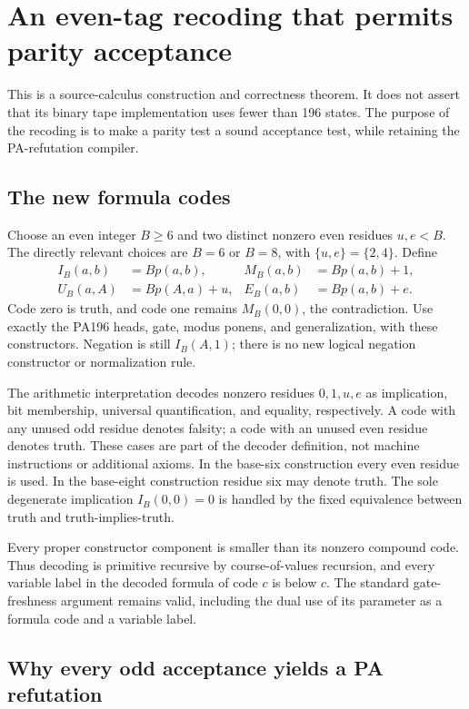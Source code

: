 \section{An even-tag recoding that permits parity acceptance}
\label{sec:parity-recoding}

This is a source-calculus construction and correctness theorem.  It does not
assert that its binary tape implementation uses fewer than 196 states.
The purpose of the recoding is to make a parity test a sound acceptance test,
while retaining the PA-refutation compiler.

\subsection{The new formula codes}

Choose an even integer $B\ge6$ and two distinct nonzero even residues
$u,e<B$.  The directly relevant choices are $B=6$ or $B=8$, with
$\{u,e\}=\{2,4\}$.  Define
\begin{align*}
 I_B(a,b)&=Bp(a,b),& M_B(a,b)&=Bp(a,b)+1,\\
 U_B(a,A)&=Bp(A,a)+u,& E_B(a,b)&=Bp(a,b)+e.
\end{align*}
Code zero is truth, and code one remains $M_B(0,0)$, the contradiction.
Use exactly the PA196 heads, gate, modus ponens, and generalization, with
these constructors.  Negation is still $I_B(A,1)$; there is no new logical
negation constructor or normalization rule.

The arithmetic interpretation decodes nonzero residues $0,1,u,e$ as
implication, bit membership, universal quantification, and equality,
respectively.  A code with any unused odd residue denotes falsity; a code
with an unused even residue denotes truth.  These cases are part of the
decoder definition, not machine instructions or additional axioms.  In the
base-six construction every even residue is used.  In the base-eight
construction residue six may denote truth.  The sole degenerate implication
$I_B(0,0)=0$ is handled by the fixed equivalence between truth and
truth-implies-truth.

Every proper constructor component is smaller than its nonzero compound
code.  Thus decoding is primitive recursive by course-of-values recursion,
and every variable label in the decoded formula of code $c$ is below $c$.
The standard gate-freshness argument remains valid, including the dual use
of its parameter as a formula code and a variable label.

\subsection{Why every odd acceptance yields a PA refutation}

